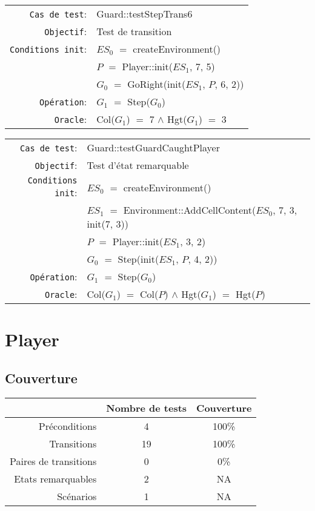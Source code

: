 \documentclass{article}
\begin{document}
{\small
  \begin{longtable}{rl}
    \texttt{Cas de test}: &\textrm{Guard::testStepTrans6}\\
    \texttt{Objectif}: & Test de transition \\
    \texttt{Conditions init}: & $ES_0$ $=$ \textrm{createEnvironment()}\\
    & $P$ $=$ \textrm{Player::init($ES_1$, 7, 5)}\\
    & $G_0$ $=$ \textrm{GoRight(init($ES_1$, $P$, 6, 2))}\\
    \texttt{Opération}: &$G_1$ $=$ \textrm{Step($G_0$)}\\
    \texttt{Oracle}: &\textrm{Col($G_1$)} $=$ 7 $\land$ \textrm{Hgt($G_1$)} $=$ 3\\
  \end{longtable}}

{\small
  \begin{longtable}{rl}
    \texttt{Cas de test}: &\textrm{Guard::testGuardCaughtPlayer}\\
    \texttt{Objectif}: & Test d'état remarquable \\
    \texttt{Conditions init}: & $ES_0$ $=$ \textrm{createEnvironment()}\\
    & $ES_1$ $=$ \textrm{Environment::AddCellContent($ES_0$, 7, 3, init(7, 3))}\\
    & $P$ $=$ \textrm{Player::init($ES_1$, 3, 2)}\\
    & $G_0$ $=$ \textrm{Step(init($ES_1$, $P$, 4, 2))}\\
    \texttt{Opération}: &$G_1$ $=$ \textrm{Step($G_0$)}\\
    \texttt{Oracle}: &\textrm{Col($G_1$)} $=$ \textrm{Col($P$)} $\land$ \textrm{Hgt($G_1$)} $=$ \textrm{Hgt($P$)}\
  \end{longtable}}

\section{Player}

\begin{minipage}{\textwidth}
\subsection{Couverture}

\begin{longtable}{r|cc}
  &Nombre de tests&Couverture\\
  \hline
  Préconditions & 4 & 100\% \\
  Transitions & 19 & 100\% \\
  Paires de transitions & 0 & 0\% \\
  Etats remarquables & 2 & NA\\
  Scénarios & 1& NA\\
\end{longtable}
\end{minipage}
\end{document}
